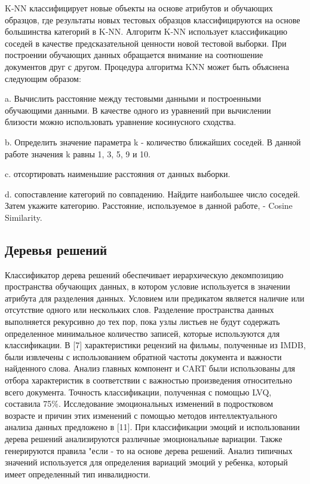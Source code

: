 K-NN классифицирует новые объекты на основе атрибутов и обучающих образцов, где
результаты новых тестовых образцов классифицируются на основе большинства
категорий в K-NN. Алгоритм K-NN использует классификацию соседей в качестве
предсказательной ценности новой тестовой выборки.  При построении обучающих
данных обращается внимание на соотношение документов друг с другом.  Процедура
алгоритма KNN может быть объяснена следующим образом:

a. Вычислить расстояние между тестовыми данными и построенными обучающими
данными.  В качестве одного из уравнений при вычислении близости можно
использовать уравнение косинусного сходства.

b. Определить значение параметра k - количество ближайших соседей. В данной
работе значения k равны 1, 3, 5, 9 и 10. 

c. отсортировать наименьшие расстояния от данных выборки.

d. сопоставление категорий по совпадению. Найдите наибольшее число соседей.
Затем укажите категорию.  Расстояние, используемое в данной работе, - Cosine
Similarity. \cite{article19}

\subsection{Деревья решений}

Классификатор дерева решений обеспечивает иерархическую декомпозицию
пространства обучающих данных, в котором условие используется в значении
атрибута для разделения данных. Условием или предикатом является наличие или
отсутствие одного или нескольких слов. Разделение пространства данных
выполняется рекурсивно до тех пор, пока узлы листьев не будут содержать
определенное минимальное количество записей, которые используются для
классификации. В [7] характеристики рецензий на фильмы, полученные из IMDB,
были извлечены с использованием обратной частоты документа и важности найденного
слова. Анализ главных компонент и CART были использованы для отбора
характеристик в соответствии с важностью произведения относительно всего
документа. Точность классификации, полученная с помощью LVQ, составила 75\%.
Исследование эмоциональных изменений в подростковом возрасте и причин этих
изменений с помощью методов интеллектуального анализа данных предложено в [11].
При классификации эмоций и использовании дерева решений анализируются различные
эмоциональные вариации. Также генерируются правила "если - то на основе дерева
решений. Анализ типичных значений используется для определения вариаций эмоций у
ребенка, который имеет определенный тип инвалидности.~\cite{article4}

